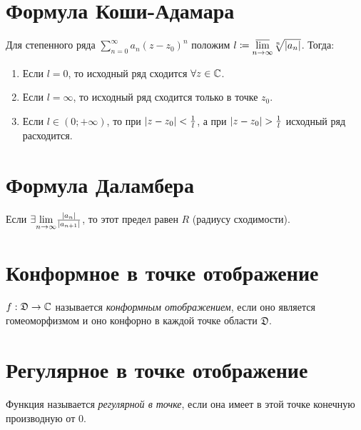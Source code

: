 \section{Формула Коши-Адамара}

\begin{theorem}
	Для степенного ряда $\sum_{n=0}^{\infty}a_n(z-z_0)^n$ положим $l\coloneq \underset{n \rightarrow \infty}{\overline{\lim}}\sqrt[n]{\left\lvert a_n\right\rvert}$. Тогда:
	\begin{enumerate}
		\item Если $l=0$, то исходный ряд сходится $\forall z \in \mathbb{C}$.
		\item Если $l = \infty$, то исходный ряд сходится только в точке $z_0$.
		\item Если $l \in (0 ; +\infty)$, то при $\left\lvert z-z_0\right\rvert < \frac{1}{l}$, а при $\left\lvert z-z_0\right\rvert > \frac{1}{l}$ исходный ряд расходится.
	\end{enumerate}
\end{theorem}

\section{Формула Даламбера}

\begin{remark}
	Если $\exists \underset{n \rightarrow \infty}{\lim}\frac{\left\lvert a_n\right\rvert}{\left\lvert a_{n+1}\right\rvert}$, то этот предел равен $R$ (радиусу сходимости).
\end{remark}

\section{Конформное в точке отображение}

\begin{definition}
	$f: \mathfrak{D}\rightarrow \mathbb{C}$ называется \emph{конформным отображением}, если оно является гомеоморфизмом и оно конфорно в каждой точке области $\mathfrak{D}$.
\end{definition}

\newpage

\section{Регулярное в точке отображение}

\begin{definition}
	Функция называется \emph{регулярной в точке}, если она имеет в этой точке конечную производную от $0$.
\end{definition}

